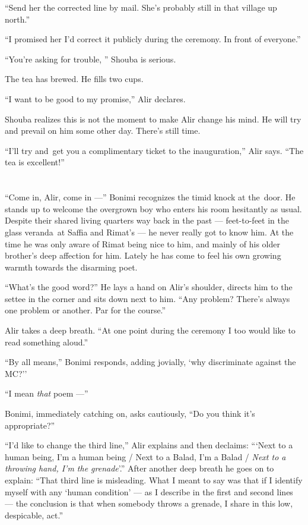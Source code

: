 \documentclass[twoside,11pt]{book}
\begin{document}
``Send her the corrected line by mail. She's probably still in that village up north.''

``I promised her I'd correct it publicly during the ceremony. In front of everyone.''

``You're asking for trouble, '' Shouba is serious.

The tea has brewed. He fills two cups.

``I want to be good to my promise,'' Alir declares.

Shouba realizes this is not the moment to make Alir change his mind. He will try and prevail on him some other day.
There's still time.

``I'll try and~get you a complimentary ticket to the inauguration,'' Alir says.
``The tea is excellent!''



\chapter{}

``Come in, Alir, come in ---'' Bonimi recognizes the timid knock at the~door. He stands up to
welcome the overgrown boy who enters his room hesitantly as usual. Despite their shared living quarters way back in
the past --- feet-to-feet in the glass veranda~at Saffia and Rimat's --- he never really got to
know him. At the time he was only aware of Rimat being nice to him, and mainly of his older brother's deep affection
for him. Lately he has come to feel his own growing warmth towards the disarming poet.

``What's the good word?'' He lays a hand on Alir's shoulder, directs him to the settee in the
corner and sits down next to him. ``Any problem? There's always one problem or another. Par for the
course.''

Alir takes a deep breath. ``At one point during the ceremony I too would like to read something
aloud.''

``By all means,'' Bonimi responds, adding jovially,
`why discriminate against the MC?''

``I mean \textit{that} poem ---''

Bonimi, immediately catching on, asks cautiously, ``Do you think it's appropriate?''

``I'd like to change the third line,'' Alir explains and then declaims: ``{\thinspace}`Next
to a human being, I'm a human being / Next to a Balad, I'm a Balad / \textit{Next to a throwing hand, I'm the
grenade}'.'' After another deep breath he goes on to explain: ``That third line is
misleading. What I meant to say was that if I identify myself with any `human condition' --- as I describe in the first
and second lines --- the conclusion is that when somebody throws a grenade, I share in this low, despicable, act.''
\end{document}
